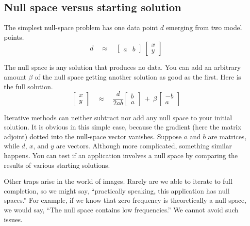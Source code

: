 

\subsection{Null space versus starting solution}
The simplest null-space problem has one data point $d$ emerging from two model points.
\begin{equation}
\label{eqn:fullblown}
d \quad \approx \quad
\left[
	\begin{array}{cc}
		a & b
	\end{array}
\right]
\
\left[
	\begin{array}{c}
		x\\y
	\end{array}
\right]
\end{equation}

\par\noindent
The null space is any solution that produces no data.
You can add an arbitrary amount $\beta$ of the null space
getting another solution as good as the first.
Here is the full solution.
\begin{equation}
\left[
	\begin{array}{r}
		x\\y
	\end{array}
\right]
\quad \approx  \quad
\frac{d}{2ab}
\left[
	\begin{array}{r}
		b\\ a
	\end{array}
\right]
\ + \
\beta\,
\left[
	\begin{array}{r}
		-b\\a
	\end{array}
\right]
\end{equation}

Iterative methods can neither subtract nor add any null space
to your initial solution.
It is obvious in this simple case,
because the gradient
(here the matrix adjoint)
dotted into the null-space vector vanishes.
Suppose $a$ and $b$ are matrices,
while $d$, $x$, and $y$ are vectors.
Although more complicated, something similar happens.
You can test if an application involves a null space
by comparing the results of various starting solutions.

\par
Other traps arise in the world of images.
Rarely are we able to iterate to full completion,
so we might say, ``practically speaking, this application has null spaces.''
For example, if we know that zero frequency is theoretically
a null space, we would say,
``The null space contains low frequencies.''
We cannot avoid such issues.

